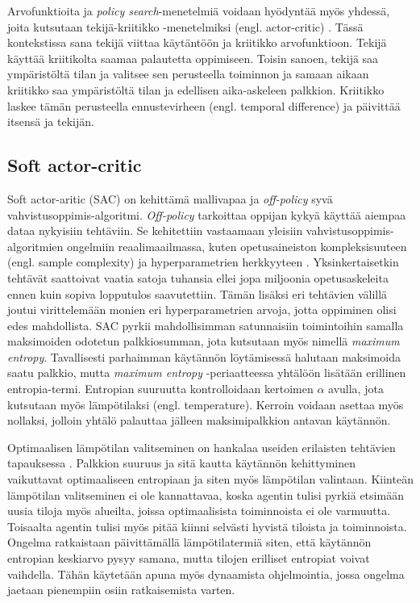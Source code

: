 \documentclass[utf8]{gradu3}
\begin{document}
Arvofunktioita ja \textit{policy search}-menetelmiä voidaan hyödyntää myös yhdessä, joita kutsutaan tekijä-kriitikko -menetelmiksi (engl. actor-critic) \parencite{arulkumaran2017brief}. Tässä kontekstissa sana tekijä viittaa käytäntöön ja kriitikko arvofunktioon. Tekijä käyttää kriitikolta saamaa palautetta oppimiseen. Toisin sanoen, tekijä saa ympäristöltä tilan ja valitsee sen perusteella toiminnon ja samaan aikaan kriitikko saa ympäristöltä tilan ja edellisen aika-askeleen palkkion. Kriitikko laskee tämän perusteella ennustevirheen (engl. temporal difference) ja päivittää itsensä ja tekijän.

\subsection{Soft actor-critic}

Soft actor-aritic (SAC) on \textcite{haarnoja2018soft} kehittämä mallivapaa ja \textit{off-policy} syvä vahvistusoppimis-algoritmi. \textit{Off-policy} tarkoittaa oppijan kykyä käyttää aiempaa dataa nykyisiin tehtäviin. Se kehitettiin vastaamaan yleisiin vahvistusoppimis-algoritmien ongelmiin reaalimaailmassa, kuten opetusaineiston kompleksisuuteen (engl. sample complexity) ja hyperparametrien herkkyyteen \parencite{haarnoja2018app}. Yksinkertaisetkin tehtävät saattoivat vaatia satoja tuhansia ellei jopa miljoonia opetusaskeleita ennen kuin sopiva lopputulos saavutettiin. Tämän lisäksi eri tehtävien välillä joutui virittelemään monien eri hyperparametrien arvoja, jotta oppiminen olisi edes mahdollista. SAC pyrkii mahdollisimman satunnaisiin toimintoihin samalla maksimoiden odotetun palkkiosumman, jota kutsutaan myös nimellä \textit{maximum entropy}. Tavallisesti parhaimman käytännön löytämisessä halutaan maksimoida saatu palkkio, mutta \textit{maximum entropy} -periaatteessa yhtälöön lisätään erillinen entropia-termi. Entropian suuruutta kontrolloidaan kertoimen $\alpha$ avulla, jota kutsutaan myös lämpötilaksi (engl. temperature). Kerroin voidaan asettaa myös nollaksi, jolloin yhtälö palauttaa jälleen maksimipalkkion antavan käytännön.

Optimaalisen lämpötilan valitseminen on hankalaa useiden erilaisten tehtävien tapauksessa \parencite{haarnoja2018app}. Palkkion suuruus ja sitä kautta käytännön kehittyminen vaikuttavat optimaaliseen entropiaan ja siten myös lämpötilan valintaan. Kiinteän lämpötilan valitseminen ei ole kannattavaa, koska agentin tulisi pyrkiä etsimään uusia tiloja myös alueilta, joissa optimaalisista toiminnoista ei ole varmuutta. Toisaalta agentin tulisi myös pitää kiinni selvästi hyvistä tiloista ja toiminnoista. Ongelma ratkaistaan päivittämällä lämpötilatermiä siten, että käytännön entropian keskiarvo pysyy samana, mutta tilojen erilliset entropiat voivat vaihdella. Tähän käytetään apuna myös dynaamista ohjelmointia, jossa ongelma jaetaan pienempiin osiin ratkaisemista varten.
\end{document}
